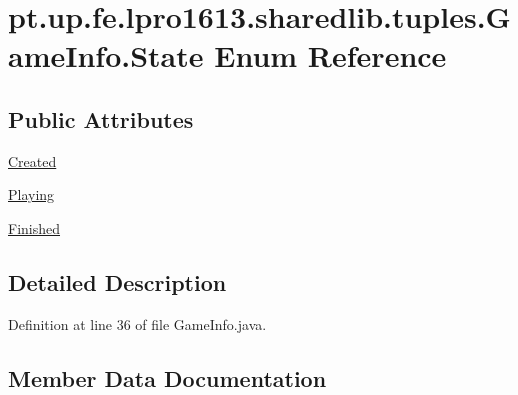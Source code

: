 \hypertarget{enumpt_1_1up_1_1fe_1_1lpro1613_1_1sharedlib_1_1tuples_1_1_game_info_1_1_state}{}\section{pt.\+up.\+fe.\+lpro1613.\+sharedlib.\+tuples.\+Game\+Info.\+State Enum Reference}
\label{enumpt_1_1up_1_1fe_1_1lpro1613_1_1sharedlib_1_1tuples_1_1_game_info_1_1_state}
\subsection*{Public Attributes}
\begin{DoxyCompactItemize}
\item 
\hyperlink{enumpt_1_1up_1_1fe_1_1lpro1613_1_1sharedlib_1_1tuples_1_1_game_info_1_1_state_a3c911cef19f0e6a6e21536f55dd2346c}{Created}
\item 
\hyperlink{enumpt_1_1up_1_1fe_1_1lpro1613_1_1sharedlib_1_1tuples_1_1_game_info_1_1_state_a91c1fe99e5b17a36fc9ba849d8e1be86}{Playing}
\item 
\hyperlink{enumpt_1_1up_1_1fe_1_1lpro1613_1_1sharedlib_1_1tuples_1_1_game_info_1_1_state_a6027237a3e12ffc90ede63090e68cc98}{Finished}
\end{DoxyCompactItemize}


\subsection{Detailed Description}


Definition at line 36 of file Game\+Info.\+java.



\subsection{Member Data Documentation}
\hypertarget{enumpt_1_1up_1_1fe_1_1lpro1613_1_1sharedlib_1_1tuples_1_1_game_info_1_1_state_a3c911cef19f0e6a6e21536f55dd2346c}{}\label{enumpt_1_1up_1_1fe_1_1lpro1613_1_1sharedlib_1_1tuples_1_1_game_info_1_1_state_a3c911cef19f0e6a6e21536f55dd2346c} 
